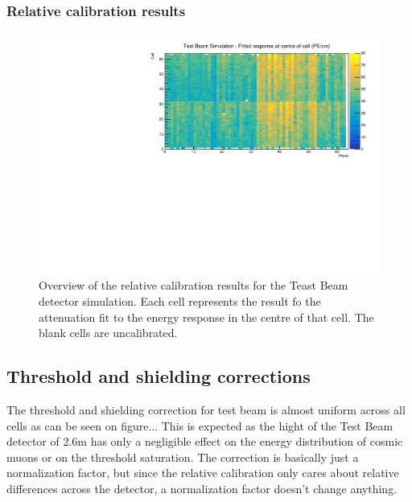 \documentclass[12pt,a4paper]{article}
\begin{document}
\subsubsection*{Relative calibration results}
\begin{figure}[!hbtp]
\centering
\includegraphics[width=\textwidth]{Plots/CellResponseAtCentre_Prod4DataBasedSim_Limited.pdf}
\caption{Overview of the relative calibration results for the Teast Beam detector simulation. Each cell represents the result fo the attenuation fit to the energy response in the centre of that cell. The blank cells are uncalibrated.}
\end{figure}

\subsection{Threshold and shielding corrections}
The threshold and shielding correction for test beam is almost uniform across all cells as can be seen on figure... This is expected as the hight of the Test Beam detector of 2.6m has only a negligible effect on the energy distribution of cosmic muons or on the threshold saturation. The correction is basically just a normalization factor, but since the relative calibration only cares about relative differences across the detector, a normalization factor doesn't change anything.
\end{document}
